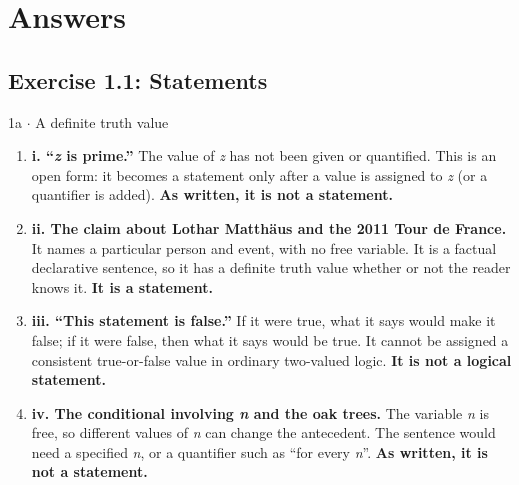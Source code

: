 \documentclass[11pt]{article}
\begin{document}
\section{Answers}
\begin{keepsection}\subsection{Exercise 1.1: Statements}

\begin{workedbox}{1a \ensuremath{\cdot} A definite truth value}
\begin{enumerate}
\item \textbf{i. “\textit{z} is prime.”} The value of \textit{z} has not been given or quantified. This is an open form: it becomes a statement only after a value is assigned to \textit{z} (or a quantifier is added). \textbf{As written, it is not a statement.}
\item \textbf{ii. The claim about Lothar Matthäus and the 2011 Tour de France.} It names a particular person and event, with no free variable. It is a factual declarative sentence, so it has a definite truth value whether or not the reader knows it. \textbf{It is a statement.}
\item \textbf{iii. “This statement is false.”} If it were true, what it says would make it false; if it were false, then what it says would be true. It cannot be assigned a consistent true-or-false value in ordinary two-valued logic. \textbf{It is not a logical statement.}
\item \textbf{iv. The conditional involving \textit{n} and the oak trees.} The variable \textit{n} is free, so different values of \textit{n} can change the antecedent. The sentence would need a specified \textit{n}, or a quantifier such as “for every \textit{n}”. \textbf{As written, it is not a statement.}
\end{enumerate}
\end{workedbox}

\end{keepsection}
\end{document}
